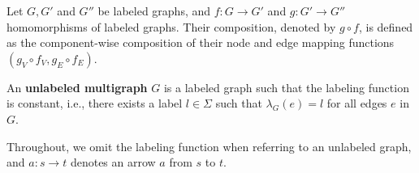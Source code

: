 \begin{definition}
    \label{def:graph:composition}
    Let $G, G'$ and $G''$ be labeled graphs, and $f: G \to G'$ and $g: G' \to G''$ homomorphisms of labeled graphs. Their composition, denoted by $g \circ f$, is defined as the component-wise composition of their node and edge mapping functions $(g_V \circ f_V, g_E \circ f_E)$.
\end{definition}

\begin{definition}
    \label{def:graph:unlabeled}
    An \textbf{unlabeled multigraph} \( G \) is a labeled graph such that the labeling function is constant, i.e., there exists a label \( l \in \Sigma \) such that \( \lambda_G(e) = l \) for all edges \( e \) in $G$.
\end{definition}
    Throughout, we omit the labeling function when referring to an unlabeled graph, and \( a: s \to t \) denotes an arrow \( a \) from \( s \) to \( t \).